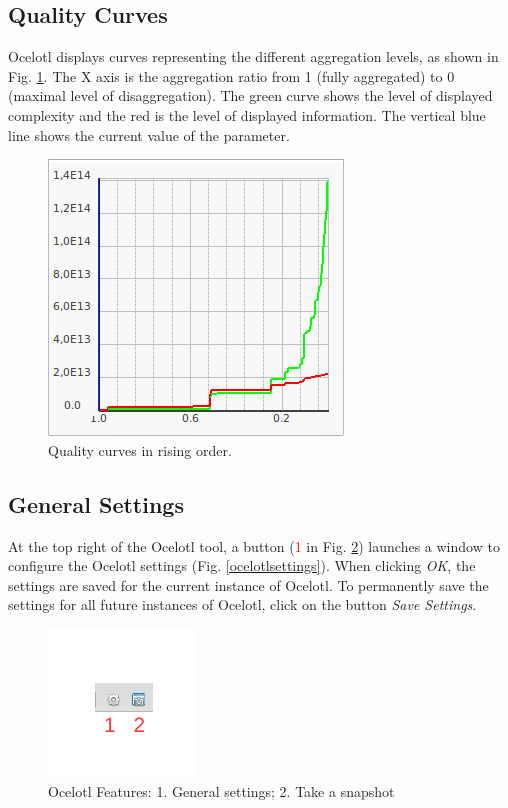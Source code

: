 \documentclass[twoside]{article}
\begin{document}
\begin{sloppypar}
\subsection{Quality Curves}
Ocelotl displays curves representing the different aggregation levels, as shown in Fig. \ref{aggregCurves}. The X axis is the aggregation ratio from 1 (fully aggregated) to 0 (maximal level of disaggregation). %
The green curve shows the level of displayed complexity and the red is the level of displayed information. 
The vertical blue line shows the current value of the parameter.

\begin{figure}[h!]
	\centering
	\includegraphics[scale=0.5]{images/ocelotlCurves.png}
	\caption{Quality curves in rising order.}
	\label{aggregCurves}
\end{figure}

\subsection{General Settings}
At the top right of the Ocelotl tool, a button (\textcolor{red}{1} in Fig. \ref{ocelotlButtons}) launches a window to configure the Ocelotl settings (Fig. \ref{ocelotlsettings}). When clicking \textit{OK}, the settings are saved for the current instance of Ocelotl. To permanently save the settings for all future instances of Ocelotl, click on the button \textit{Save Settings}.

\begin{figure}[h!]
	\centering
	\includegraphics[scale=1.5]{images/ocelotlButtons.pdf}
	\caption{Ocelotl Features: 1. General settings; 2. Take a snapshot}
	\label{ocelotlButtons}
\end{figure}


\end{sloppypar}
\end{document}

